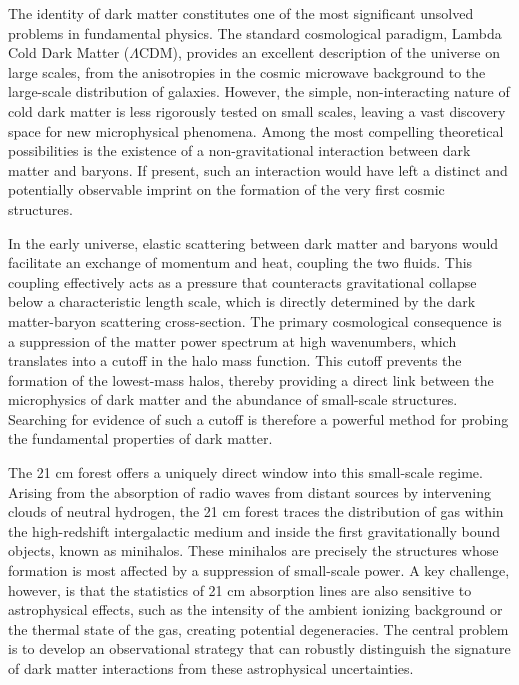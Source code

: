 \documentclass[]{article}
\begin{document}
The identity of dark matter constitutes one of the most significant unsolved problems in fundamental physics. The standard cosmological paradigm, Lambda Cold Dark Matter ($\Lambda$CDM), provides an excellent description of the universe on large scales, from the anisotropies in the cosmic microwave background to the large-scale distribution of galaxies. However, the simple, non-interacting nature of cold dark matter is less rigorously tested on small scales, leaving a vast discovery space for new microphysical phenomena. Among the most compelling theoretical possibilities is the existence of a non-gravitational interaction between dark matter and baryons. If present, such an interaction would have left a distinct and potentially observable imprint on the formation of the very first cosmic structures.

In the early universe, elastic scattering between dark matter and baryons would facilitate an exchange of momentum and heat, coupling the two fluids. This coupling effectively acts as a pressure that counteracts gravitational collapse below a characteristic length scale, which is directly determined by the dark matter-baryon scattering cross-section. The primary cosmological consequence is a suppression of the matter power spectrum at high wavenumbers, which translates into a cutoff in the halo mass function. This cutoff prevents the formation of the lowest-mass halos, thereby providing a direct link between the microphysics of dark matter and the abundance of small-scale structures. Searching for evidence of such a cutoff is therefore a powerful method for probing the fundamental properties of dark matter.

The 21 cm forest offers a uniquely direct window into this small-scale regime. Arising from the absorption of radio waves from distant sources by intervening clouds of neutral hydrogen, the 21 cm forest traces the distribution of gas within the high-redshift intergalactic medium and inside the first gravitationally bound objects, known as minihalos. These minihalos are precisely the structures whose formation is most affected by a suppression of small-scale power. A key challenge, however, is that the statistics of 21 cm absorption lines are also sensitive to astrophysical effects, such as the intensity of the ambient ionizing background or the thermal state of the gas, creating potential degeneracies. The central problem is to develop an observational strategy that can robustly distinguish the signature of dark matter interactions from these astrophysical uncertainties.
\end{document}
